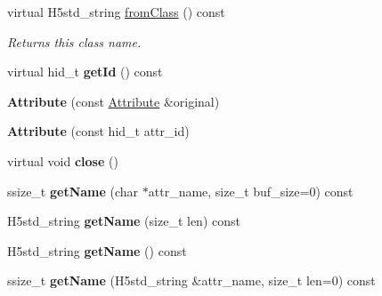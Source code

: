 \begin{DoxyCompactItemize}
\mbox{\label{class_h5_1_1_attribute_a2ede405f542c51aebc38cfcadfdd7d95}} 
virtual H5std\+\_\+string \hyperlink{class_h5_1_1_attribute_a2ede405f542c51aebc38cfcadfdd7d95}{from\+Class} () const
\begin{DoxyCompactList}\small\item\em Returns this class name. \end{DoxyCompactList}\item 
\mbox{\label{class_h5_1_1_attribute_ade26b6838cefaeab54f847b862fcc87d}} 
virtual hid\+\_\+t {\bfseries get\+Id} () const
\item 
\mbox{\label{class_h5_1_1_attribute_ab93ec0beebebfa3a204f4ff8e16be985}} 
{\bfseries Attribute} (const \hyperlink{class_h5_1_1_attribute}{Attribute} \&original)
\item 
\mbox{\label{class_h5_1_1_attribute_afad0e7bbf53e568c8849f23b2478c08c}} 
{\bfseries Attribute} (const hid\+\_\+t attr\+\_\+id)
\item 
\mbox{\label{class_h5_1_1_attribute_ad5e930e6b2e70122209f128da9e444df}} 
virtual void {\bfseries close} ()
\item 
\mbox{\label{class_h5_1_1_attribute_a43dac14905f7d25d108516a9997205b3}} 
ssize\+\_\+t {\bfseries get\+Name} (char $\ast$attr\+\_\+name, size\+\_\+t buf\+\_\+size=0) const
\item 
\mbox{\label{class_h5_1_1_attribute_a9bab45c794bf86ea9f18f89eee68eb6e}} 
H5std\+\_\+string {\bfseries get\+Name} (size\+\_\+t len) const
\item 
\mbox{\label{class_h5_1_1_attribute_a9be026c140282deb12319435223f3dc5}} 
H5std\+\_\+string {\bfseries get\+Name} () const
\item 
\mbox{\label{class_h5_1_1_attribute_a9a06b563966ad36df1ddd878b4d310c6}} 
ssize\+\_\+t {\bfseries get\+Name} (H5std\+\_\+string \&attr\+\_\+name, size\+\_\+t len=0) const
\item 
\mbox{\label{class_h5_1_1_attribute_a0aaf951321adb3f71f6aae3a220b3124}} 

\end{DoxyCompactItemize}
